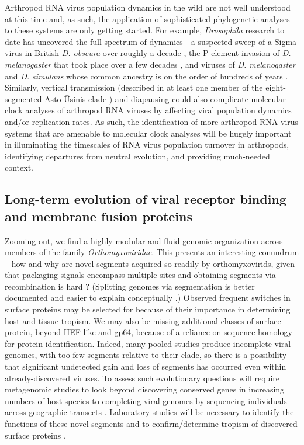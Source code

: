 \documentclass[11pt]{article}
\begin{document}
Arthropod RNA virus population dynamics in the wild are not well understood at this time and, as such, the application of sophisticated phylogenetic analyses to these systems are only getting started.
For example, \textit{Drosophila} research to date has uncovered the full spectrum of dynamics - a suspected sweep of a Sigma virus in British \textit{D. obscura} over roughly a decade \citep{longdon_rhabdoviruses_2011}, the P element invasion of \textit{D. melanogaster} that took place over a few decades \citep{anxolabehere_molecular_1988}, and viruses of \textit{D. melanogaster} and \textit{D. simulans} whose common ancestry is on the order of hundreds of years \citep{webster_discovery_2015}.
Similarly, vertical transmission (described in at least one member of the eight-segmented Asto-\={U}sinis clade \citep{coatsworth_intrinsic_2022}) and diapausing could also complicate molecular clock analyses of arthropod RNA viruses by affecting viral population dynamics and/or replication rates.
As such, the identification of more arthropod RNA virus systems that are amenable to molecular clock analyses will be hugely important in illuminating the timescales of RNA virus population turnover in arthropods, identifying departures from neutral evolution, and providing much-needed context.


\subsection{Long-term evolution of viral receptor binding and membrane fusion proteins}

Zooming out, we find a highly modular and fluid genomic organization across members of the family \textit{Orthomyxoviridae}.
This presents an interesting conundrum -- how and why are novel segments acquired so readily by orthomyxovirids, given that packaging signals encompass multiple sites \citep{baker_influenza_2014} and obtaining segments via recombination is hard \citep{chare_phylogenetic_2003}? (Splitting genomes via segmentation is better documented \citep{kondo_orchid_2006,qin_tick-borne_2014} and easier to explain conceptually \citep{ke_phylodynamic_2013}.) 
Observed frequent switches in surface proteins may be selected for because of their importance in determining host and tissue tropism.
We may also be missing additional classes of surface protein, beyond HEF-like and gp64, because of a reliance on sequence homology for protein identification.
Indeed, many pooled studies produce incomplete viral genomes, with too few segments relative to their clade, so there is a possibility that significant undetected gain and loss of segments has occurred even within already-discovered viruses.
To assess such evolutionary questions will require metagenomic studies to look beyond discovering conserved genes in increasing numbers of host species to completing viral genomes by sequencing individuals across geographic transects \citep{batson_single_2021}.
Laboratory studies will be necessary to identify the functions of these novel segments and to confirm/determine tropism of discovered surface proteins \citep{arunkumar_functionality_2021}.
\end{document}
